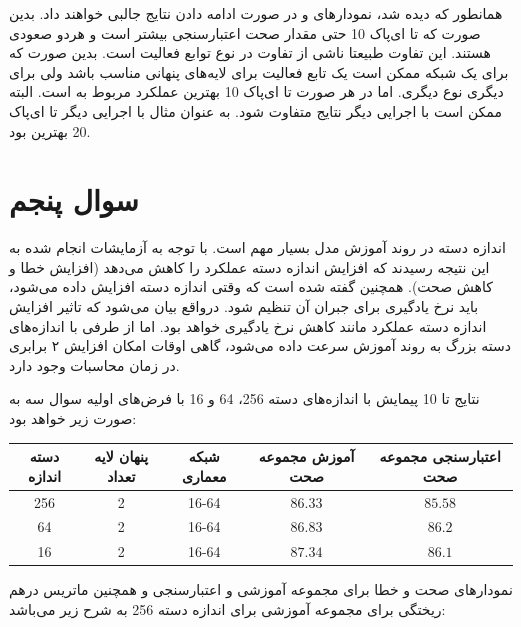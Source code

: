 \documentclass{article}
\begin{document}
\cleardoublepage
همانطور که دیده شد، نمودارهای  و  در صورت ادامه دادن نتایج جالبی خواهند داد. بدین صورت که تا ای‌پاک 10 حتی مقدار صحت اعتبارسنجی بیشتر است و هردو صعودی هستند.
این تفاوت طبیعتا ناشی از تفاوت در نوع توابع فعالیت است. بدین صورت که برای یک شبکه ممکن است یک تابع فعالیت برای لایه‌های پنهانی مناسب باشد ولی برای دیگری نوع دیگری. 
اما در هر صورت تا ای‌پاک 10 بهترین عملکرد مربوط به  است. البته ممکن است با اجرایی دیگر نتایج متفاوت شود. به عنوان مثال با اجرایی دیگر تا ای‌پاک 20  بهترین بود.


\section{سوال پنجم}

اندازه‌ دسته در روند آموزش مدل بسیار مهم است. با توجه به آزمایشات انجام شده به این نتیجه رسیدند که افزایش اندازه دسته عملکرد را کاهش می‌دهد (افزایش خطا و کاهش صحت). همچنین گفته شده است که وقتی اندازه دسته افزایش داده می‌شود، باید نرخ یادگیری برای جبران آن تنظیم شود. درواقع بیان می‌شود که تاثیر افزایش اندازه دسته عملکرد مانند کاهش نرخ یادگیری خواهد بود. اما از طرفی با اندازه‌های دسته‌ بزرگ به روند آموزش سرعت داده می‌شود، گاهی اوقات امکان افزایش ۲ برابری در زمان محاسبات وجود دارد.

نتایج تا 10 پیمایش با اندازه‌های دسته 256، 64 و 16 با فرض‌های اولیه سوال سه به صورت زیر خواهد بود:


\begin{longtable}{|c|c|c|c|c|}
    \hline
    دسته اندازه& پنهان لایه تعداد & شبکه معماری & آموزش مجموعه صحت & اعتبارسنجی مجموعه صحت \\ \hline
    256 & 2 & 16-64  & $86.33$ & $85.58$ \\ \hline
    64 & 2 & 16-64  & $86.83$ & $86.2$ \\ \hline
    16 & 2 & 16-64  & $87.34$ & $86.1$ \\ \hline
\end{longtable}


نمودارهای صحت و خطا برای مجموعه آموزشی و اعتبارسنجی و همچنین ماتریس درهم ریختگی برای مجموعه آموزشی برای اندازه دسته 256 به شرح زیر می‌باشد:
\end{document}
